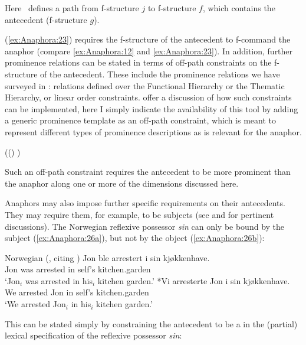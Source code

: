 \documentclass[output=paper,hidelinks]{langscibook}
\begin{document}
\ea\label{ex:Anaphora:24}
{}
\z

\noindent Here \GF* \GFPRO\UP\ defines a path from f-structure $j$ to f-structure $f$, which contains the antecedent (f-structure $g$).

(\ref{ex:Anaphora:23}) requires the f-structure of the antecedent to f-command the anaphor (compare \ref{ex:Anaphora:12} and \ref{ex:Anaphora:23}). In addition, further prominence relations can be stated in terms of off-path constraints on the f-structure of the antecedent. These include the prominence relations we have surveyed in : relations defined over the Functional Hierarchy or the Thematic Hierarchy, or linear order constraints. \citet[516--517]{DLM:LFG} offer a discussion of how such constraints can be implemented, here I simply indicate the availability of this tool by adding a generic prominence template as an off-path constraint, which is meant to represent different types of prominence descriptions as is relevant for the anaphor.


\ea\label{ex:Anaphora:25} ((\GF* \GFPRO\UP)   )
\z

\noindent Such an off-path constraint requires the antecedent to be more prominent than the anaphor along one or more of the dimensions discussed here.

Anaphors may also impose further specific requirements on their antecedents. They may require them, for example, to be subjects (see \citealt{BresnanEtAl2016}  and \citealt{DLM:LFG} for pertinent discussions). The Norwegian reflexive possessor \emph{sin} can only be bound by the subject (\ref{ex:Anaphora:26a}), but not by the object (\ref{ex:Anaphora:26b}):

\ea\label{ex:Anaphora:26} Norwegian (\citealt[510]{DLM:LFG}, citing \citealt[75]{Hellan88})
\ea\label{ex:Anaphora:26a}\gll
 Jon  ble  arrestert  i  {sin}  kjøkkenhave.\\
 Jon was arrested in self's  kitchen.garden\\
 \glt`Jon$_i$ was arrested in his$_i$ kitchen garden.'
\ex\label{ex:Anaphora:26b}\gll
 *Vi arresterte  Jon  i  {sin}  kjøkkenhave.\\
 We arrested Jon in self's  kitchen.garden\\
\glt `We arrested Jon$_i$  in his$_i$ kitchen garden.'
\z\z

\noindent This can be stated simply by constraining the antecedent to be a \SUBJ in the (partial) lexical specification of the reflexive possessor \emph{sin}:
\end{document}
